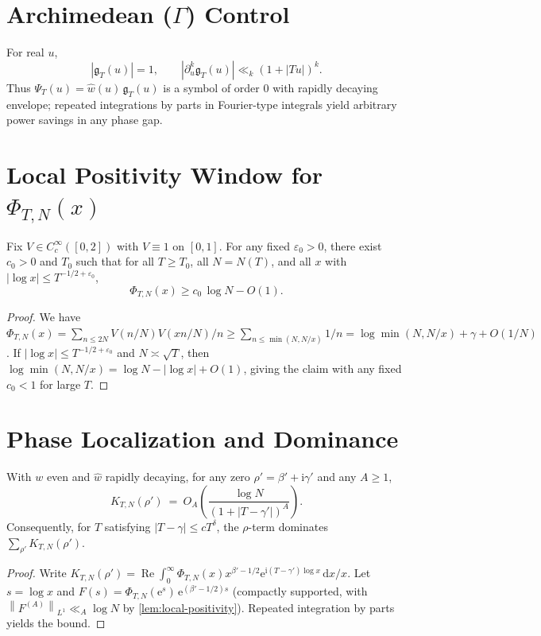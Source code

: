 \documentclass[11pt]{article}
\newcommand{\e}{\mathrm{e}}
\newcommand{\ii}{\mathrm{i}}
\newcommand{\dd}{\mathrm{d}}
\newcommand{\abs}[1]{\left\lvert #1 \right\rvert}
\newcommand{\norm}[1]{\left\lVert #1 \right\rVert}
\newcommand{\widehatw}{\widehat{w}}
\newcommand{\Rea}{\operatorname{Re}}
\begin{document}
\section{Archimedean (\texorpdfstring{$\Gamma$}{Gamma}) Control} \label{app:arch}
For real $u$,
\[
\abs{\mathfrak g_T(u)}=1,\qquad \abs{\partial_u^k \mathfrak g_T(u)}\ll_k (1+\abs{Tu})^k.
\]
Thus $\Psi_T(u)=\widehatw(u)\,\mathfrak g_T(u)$ is a symbol of order $0$ with rapidly decaying envelope; repeated integrations by parts in Fourier-type integrals yield arbitrary power savings in any phase gap.

\section{Local Positivity Window for \texorpdfstring{$\Phi_{T,N}(x)$}{Phi}} \label{app:local-positivity}
\begin{lemma}\label{lem:local-positivity}
Fix $V\in C_c^\infty([0,2])$ with $V\equiv1$ on $[0,1]$. For any fixed $\varepsilon_0>0$, there exist $c_0>0$ and $T_0$ such that for all $T\ge T_0$, all $N=N(T)$, and all $x$ with $\abs{\log x}\le T^{-1/2+\varepsilon_0}$,
\[
\Phi_{T,N}(x)\ge c_0\,\log N - O(1).
\]
\end{lemma}
\begin{proof}
We have $\Phi_{T,N}(x)=\sum_{n\le 2N} V(n/N)V(xn/N)/n\ge \sum_{n\le \min(N,N/x)}1/n=\log \min(N,N/x)+\gamma + O(1/N)$. If $\abs{\log x}\le T^{-1/2+\varepsilon_0}$ and $N\asymp\sqrt{T}$, then $\log \min(N,N/x)=\log N-\abs{\log x}+O(1)$, giving the claim with any fixed $c_0<1$ for large $T$.
\end{proof}

\section{Phase Localization and Dominance} \label{app:phase-localization}
\begin{lemma}\label{lem:phase-localization}
With $w$ even and $\widehatw$ rapidly decaying, for any zero $\rho'=\beta'+\ii\gamma'$ and any $A\ge1$,
\[
K_{T,N}(\rho')\ =\ O_A\!\left(\frac{\log N}{(1+\abs{T-\gamma'})^A}\right).
\]
Consequently, for $T$ satisfying $\abs{T-\gamma}\le cT^\delta$, the $\rho$-term dominates $\sum_{\rho'} K_{T,N}(\rho')$.
\end{lemma}
\begin{proof}
Write $K_{T,N}(\rho')=\Rea\int_0^\infty \Phi_{T,N}(x)x^{\beta'-1/2}\e^{\ii(T-\gamma')\log x}\,\dd x/x$. Let $s=\log x$ and $F(s)=\Phi_{T,N}(\e^s)\,\e^{(\beta'-1/2)s}$ (compactly supported, with $\norm{F^{(A)}}_{L^1}\ll_A \log N$ by \cref{lem:local-positivity}). Repeated integration by parts yields the bound.
\end{proof}
\end{document}
